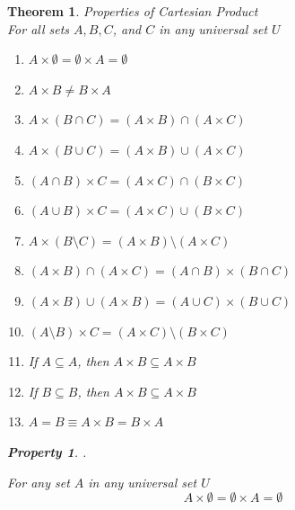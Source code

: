 \documentclass{book}
\newtheorem{theorem}{Theorem}[section]
\newtheorem{property}{Property}[theorem]
\theoremstyle{definition}
\theoremstyle{remark}
\begin{document}
\newpage
\begin{theorem}
Properties of Cartesian Product \\

For all sets $A, B, C$, and $C$ in any universal set $U$ \\

    \begin{enumerate}
        \item $A \times \emptyset = \emptyset \times A = \emptyset$
        
        \item $A \times B \neq B \times A$
        
        \item $A \times (B \cap C) = (A \times B) \cap (A \times C)$ %
        
        \item $A \times (B \cup C) = (A \times B) \cup (A \times C)$        
        
        \item $(A \cap B) \times C = (A \times C) \cap (B \times C)$        
        
        \item $(A \cup B) \times C = (A \times C) \cup (B \times C)$ 
        
        \item $A \times (B \setminus C) = (A \times B) \setminus (A \times C)$            
        
        \item $(A \times B) \cap (A \times C) = (A \cap B) \times (B \cap C)$
        
        \item $(A \times B) \cup (A \times B) = (A \cup C) \times (B \cup C)$
        
        \item $(A \setminus B) \times C = (A \times C) \setminus (B \times C)$   
        
        \item If $A \subseteq A$, then $A \times B \subseteq A \times B$
        
        \item If $B \subseteq B$, then $A \times B \subseteq A \times B$
        
        \item $A = B \equiv A \times B = B \times A$ %
    \end{enumerate}


    \newpage
    \begin{property}
    . \\
        \begin{tcolorbox}
            For any set $A$ in any universal set $U$
                \begin{equation*}
                    A \times \emptyset = \emptyset \times A = \emptyset
                \end{equation*}
        \end{tcolorbox}
    

\end{property}
\end{theorem}
\end{document}
